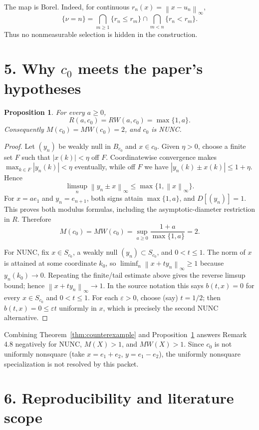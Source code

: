 \documentclass[10pt]{article}
\newtheorem{proposition}{Proposition}
\newcommand{\norm}[1]{\left\lVert #1\right\rVert_\infty}
\begin{document}
The map is Borel.  Indeed, for continuous $r_n(x)=\norm{x-u_n}$,
\[
 \{\nu=n\}=\bigcap_{m\geq1}\{r_n\leq r_m\}
 \cap\bigcap_{m<n}\{r_n<r_m\}.
\]
Thus no nonmeasurable selection is hidden in the construction.

\section*{5. Why $c_0$ meets the paper's hypotheses}

\begin{proposition}\label{prop:geometry}
For every $a\geq0$,
\[
 R(a,c_0)=RW(a,c_0)=\max\{1,a\}.
\]
Consequently $M(c_0)=MW(c_0)=2$, and $c_0$ is NUNC.
\end{proposition}

\begin{proof}
Let $(y_n)$ be weakly null in $B_{c_0}$ and $x\in c_0$.  Given
$\eta>0$, choose a finite set $F$ such that $|x(k)|<\eta$ off $F$.
Coordinatewise convergence makes $\max_{k\in F}|y_n(k)|<\eta$ eventually,
while off $F$ we have $|y_n(k)\pm x(k)|\leq1+\eta$.  Hence
\[
 \limsup_n\norm{y_n\pm x}\leq\max\{1,\norm{x}\}.
\]
For $x=ae_1$ and $y_n=e_{n+1}$, both signs attain
$\max\{1,a\}$, and $D[(y_n)]=1$.  This proves both modulus formulas,
including the asymptotic-diameter restriction in $R$.  Therefore
\[
 M(c_0)=MW(c_0)
 =\sup_{a\geq0}\frac{1+a}{\max\{1,a\}}=2.
\]

For NUNC, fix $x\in S_{c_0}$, a weakly null $(y_n)\subset S_{c_0}$, and
$0<t\leq1$.  The norm of $x$ is attained at some coordinate $k_0$, so
$\liminf_n\norm{x+t y_n}\geq1$ because $y_n(k_0)\to0$.  Repeating the
finite/tail estimate above gives the reverse limsup bound; hence
$\norm{x+t y_n}\to1$.  In the source notation this says
$b(t,x)=0$ for every $x\in S_{c_0}$ and $0<t\leq1$.  For each
$\varepsilon>0$, choose (say) $t=1/2$; then
$b(t,x)=0\leq\varepsilon t$ uniformly in $x$, which is precisely the second
NUNC alternative.
\end{proof}

Combining Theorem~\ref{thm:counterexample} and
Proposition~\ref{prop:geometry} answers Remark 4.8 negatively for NUNC,
$M(X)>1$, and $MW(X)>1$.  Since $c_0$ is not uniformly nonsquare
(take $x=e_1+e_2$, $y=e_1-e_2$), the uniformly nonsquare specialization is
not resolved by this packet.

\section*{6. Reproducibility and literature scope}
\end{document}
